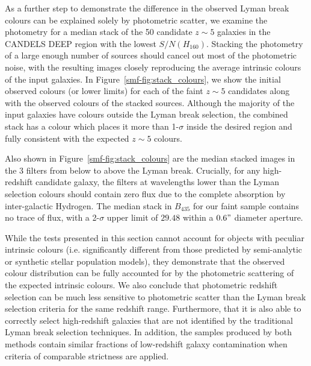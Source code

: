 As a further step to demonstrate the difference in the observed Lyman break colours can be explained solely by photometric scatter, we examine the photometry for a median stack of the 50 candidate $z \sim 5$ galaxies in the CANDELS DEEP region with the lowest $S/N(H_{160})$. Stacking the photometry of a large enough number of sources should cancel out most of the photometric noise, with the resulting images closely reproducing the average intrinsic colours of the input galaxies. In Figure~\ref{smf-fig:stack_colours}, we show the initial observed colours (or lower limits) for each of the faint $z\sim5$ candidates along with the observed colours of the stacked sources. Although the majority of the input galaxies have colours outside the Lyman break selection, the combined stack has a colour which places it more than 1-$\sigma$ inside the desired region and fully consistent with the expected $z \sim 5$ colours.

Also shown in Figure~\ref{smf-fig:stack_colours} are the median stacked images in the 3 filters from below to above the Lyman break. Crucially, for any high-redshift candidate galaxy, the filters at wavelengths lower than the Lyman selection colours should contain zero flux due to the complete absorption by inter-galactic Hydrogen. The median stack in $B_{435}$ for our faint sample contains no trace of flux, with a 2-$\sigma$ upper limit of $29.48$ within a $0.6"$ diameter aperture.

While the tests presented in this section cannot account for objects with peculiar intrinsic colours (i.e. significantly different from those predicted by semi-analytic or synthetic stellar population models), they demonstrate that the observed colour distribution can be fully accounted for by the photometric scattering of the expected intrinsic colours. We also conclude that photometric redshift selection can be much less sensitive to photometric scatter than the Lyman break selection criteria for the same redshift range. Furthermore, that it is also able to correctly select high-redshift galaxies that are not identified by the traditional Lyman break selection techniques. In addition, the samples produced by both methods contain similar fractions of low-redshift galaxy contamination when criteria of comparable strictness are applied.


